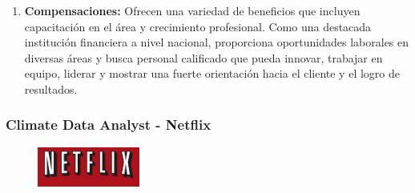 \documentclass[12pt]{article}
\begin{document}
\begin{enumerate}
                    \item \textbf{Compensaciones:}
                        Ofrecen una variedad de beneficios que incluyen capacitación en el área y crecimiento profesional. Como una destacada institución financiera a nivel nacional, proporciona oportunidades laborales en diversas áreas y busca personal calificado que pueda innovar, trabajar en equipo, liderar y mostrar una fuerte orientación hacia el cliente y el logro de resultados.

                \end{enumerate}

                


            \subsubsection{Climate Data Analyst - Netflix}

                \begin{figure}[!h]
                    \centering
                    \includegraphics[width=0.3\textwidth]{Recursos/Img/NetflixLogo.png}
                \end{figure}
\end{document}
